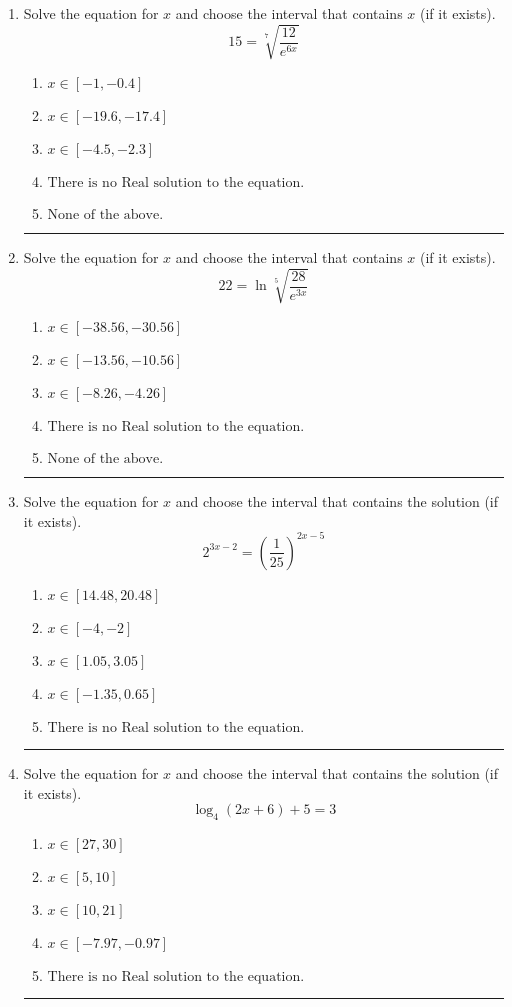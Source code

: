 \documentclass[14pt]{extbook}
\newcommand{\litem}[1]{\item#1\hspace*{-1cm}\rule{\textwidth}{0.4pt}}
\begin{document}
\begin{enumerate}
{\begin{enumerate}[label=\Alph*.]
\end{enumerate} }
\litem{
 Solve the equation for $x$ and choose the interval that contains $x$ (if it exists).\[  15 = \sqrt[7]{\frac{12}{e^{6x}}} \]\begin{enumerate}[label=\Alph*.]
\item \( x \in [-1, -0.4] \)
\item \( x \in [-19.6, -17.4] \)
\item \( x \in [-4.5, -2.3] \)
\item \( \text{There is no Real solution to the equation.} \)
\item \( \text{None of the above.} \)

\end{enumerate} }
\litem{
 Solve the equation for $x$ and choose the interval that contains $x$ (if it exists).\[  22 = \ln{\sqrt[5]{\frac{28}{e^{3x}}}} \]\begin{enumerate}[label=\Alph*.]
\item \( x \in [-38.56, -30.56] \)
\item \( x \in [-13.56, -10.56] \)
\item \( x \in [-8.26, -4.26] \)
\item \( \text{There is no Real solution to the equation.} \)
\item \( \text{None of the above.} \)

\end{enumerate} }
\litem{
Solve the equation for $x$ and choose the interval that contains the solution (if it exists).\[ 2^{3x-2} = \left(\frac{1}{25}\right)^{2x-5} \]\begin{enumerate}[label=\Alph*.]
\item \( x \in [14.48, 20.48] \)
\item \( x \in [-4, -2] \)
\item \( x \in [1.05, 3.05] \)
\item \( x \in [-1.35, 0.65] \)
\item \( \text{There is no Real solution to the equation.} \)

\end{enumerate} }
\litem{
Solve the equation for $x$ and choose the interval that contains the solution (if it exists).\[ \log_{4}{(2x+6)}+5 = 3 \]\begin{enumerate}[label=\Alph*.]
\item \( x \in [27, 30] \)
\item \( x \in [5, 10] \)
\item \( x \in [10, 21] \)
\item \( x \in [-7.97, -0.97] \)
\item \( \text{There is no Real solution to the equation.} \)


\end{enumerate}}
\end{enumerate}
\end{document}
